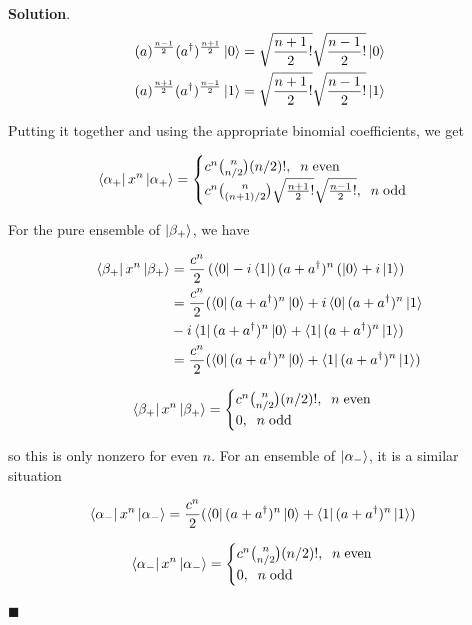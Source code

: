\documentclass[12pt]{article}
\theoremstyle{definition}
\newenvironment{s}{%
        \begin{trivlist} \item \textbf{Solution}. }{%
            \hspace*{\fill} $\blacksquare$\end{trivlist}}%
\begin{document}
{\begin{s}
\begin{align*}
(a)^{\frac{n-1}{2}}(a^{\dagger})^{\frac{n+1}{2}}\ket{0} &= \sqrt{\frac{n+1}{2}!}\sqrt{\frac{n-1}{2}!}\ket{0}\\
(a)^{\frac{n+1}{2}}(a^{\dagger})^{\frac{n-1}{2}}\ket{1} &= \sqrt{\frac{n+1}{2}!}\sqrt{\frac{n-1}{2}!}\ket{1}\\
\end{align*}

Putting it together and using the appropriate binomial coefficients, we get

$$
\bra{\alpha_+}x^{n}\ket{\alpha_+}=
\begin{cases}
c^{n}{n\choose n/2}(n/2)!, \;\;n \;\mathrm{even} \\
c^{n}{n\choose (n+1)/2}\sqrt{\frac{n+1}{2}!}\sqrt{\frac{n-1}{2}!}, \;\;n \;\mathrm{odd} \\
\end{cases}
$$

For the pure ensemble of $\ket{\beta_{+}}$, we have

\begin{align*}
\bra{\beta_+}x^{n}\ket{\beta_+} &= \frac{c^{n}}{2}\left(\bra{0} - i\bra{1}\right)(a+a^{\dagger})^{n}\left(\ket{0} + i\ket{1}\right)\\
&= \frac{c^{n}}{2}(\bra{0}(a+a^{\dagger})^{n}\ket{0} + i\bra{0}(a+a^{\dagger})^{n}\ket{1}\\
&- i\bra{1}(a+a^{\dagger})^{n}\ket{0} + \bra{1}(a+a^{\dagger})^{n}\ket{1})\\
&= \frac{c^{n}}{2}(\bra{0}(a+a^{\dagger})^{n}\ket{0} + \bra{1}(a+a^{\dagger})^{n}\ket{1})
\end{align*}

$$
\bra{\beta_+}x^{n}\ket{\beta_+}=
\begin{cases}
c^{n}{n\choose n/2}(n/2)!, \;\;n \;\mathrm{even} \\
0, \;\;n \;\mathrm{odd} \\
\end{cases}
$$

so this is only nonzero for even $n$. For an ensemble of $\ket{\alpha_{-}}$, it is a similar situation 

\begin{align*}
\bra{\alpha_-}x^{n}\ket{\alpha_-} &= \frac{c^{n}}{2}(\bra{0}(a+a^{\dagger})^{n}\ket{0} + \bra{1}(a+a^{\dagger})^{n}\ket{1})
\end{align*}

$$
\bra{\alpha_-}x^{n}\ket{\alpha_-}=
\begin{cases}
c^{n}{n\choose n/2}(n/2)!, \;\;n \;\mathrm{even} \\
0, \;\;n \;\mathrm{odd} \\
\end{cases}
$$


\end{s}}
\end{document}
